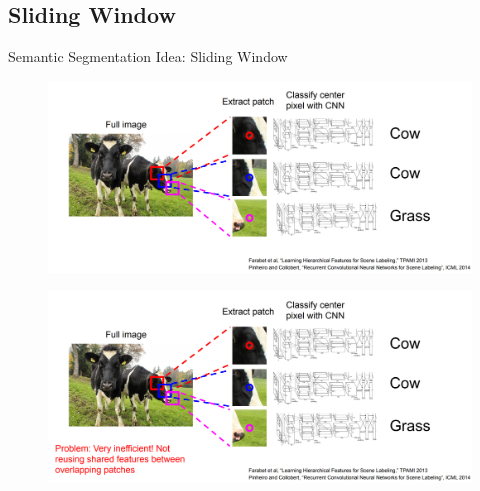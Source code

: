 \subsection{Sliding Window}

\begin{frame}[allowframebreaks]{Semantic Segmentation Idea: Sliding Window}
    \begin{figure}
        \centering
        \includegraphics[width=1.0\textwidth,height=1.0\textheight,keepaspectratio]{images/segmentation/sem_3.png}
    \end{figure}

\framebreak

    \begin{figure}
        \centering
        \includegraphics[width=1.0\textwidth,height=1.0\textheight,keepaspectratio]{images/segmentation/sem_4.png}
    \end{figure}
    
\end{frame}
